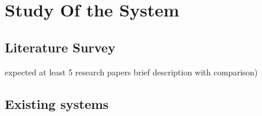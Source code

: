
\chapter{Study Of the System} \label{chap2}

\newpage






\section{Literature Survey}
expected at least 5 research papers brief description with comparison)

\section{Existing systems}







	





